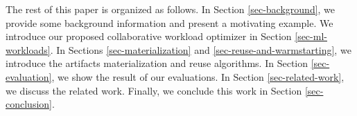 The rest of this paper is organized as follows.
In Section \ref{sec-background}, we provide some background information and present a motivating example.
We introduce our proposed collaborative workload optimizer in Section \ref{sec-ml-workloads}.
In Sections \ref{sec-materialization} and \ref{sec-reuse-and-warmstarting}, we introduce the artifacts materialization and reuse algorithms.
In Section \ref{sec-evaluation}, we show the result of our evaluations.
In Section \ref{sec-related-work}, we discuss the related work.
Finally, we conclude this work in Section \ref{sec-conclusion}.